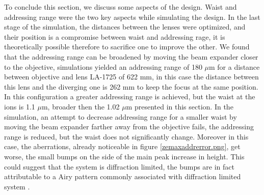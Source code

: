 To conclude this section, we discuss some aspects of the design. Waist and addressing range were the two key aspects while simulating the design. In the last stage of the simulation, the distances between the lenses were optimized, and their position is a compromise between waist and addressing rage, it is theoretically possible therefore to sacrifice one to improve the other. We found that the addressing range can be broadened by moving the beam expander closer to the objective, simulations yielded an addressing range of 180 $\mu$m for a distance between objective and lens LA-1725 of 622 mm, in this case the distance between this lens and the diverging one is 262 mm to keep the focus at the same position. In this configuration a greater addressing range is achieved, but the waist at the ions is 1.1 $\mu$m, broader then the 1.02 $\mu$m presented in this section. In the simulation, an attempt to decrease addressing range for a smaller waist by moving the beam expander farther away from the objective fails, the addressing range is reduced, but the waist does not significantly change. Moreover in this case, the aberrations, already noticeable in figure \ref{zemaxaddrerror.png}, get worse, the small bumps on the side of the main peak increase in height. This could suggest that the system is diffraction limited, the bumps are in fact attributable to a Airy pattern commonly associated with diffraction limited system \cite{dlimited}.
